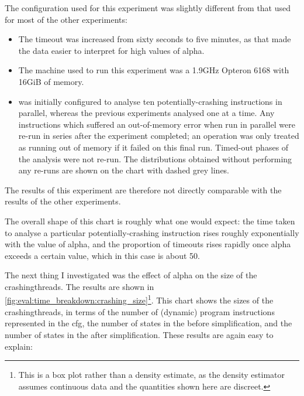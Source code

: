 The configuration used for this experiment was slightly different from
that used for most of the other experiments:
\begin{itemize}
\item The timeout was increased from sixty seconds to five minutes, as
  that made the data easier to interpret for high values of
  \gls{alpha}.
\item The machine used to run this experiment was a 1.9GHz Opteron
  6168 with 16GiB of memory.
\item {\Implementation} was initially configured to analyse ten
  potentially-crashing instructions in parallel, whereas the previous
  experiments analysed one at a time.  Any instructions which suffered
  an out-of-memory error when run in parallel were re-run in series
  after the experiment completed; an operation was only treated as
  running out of memory if it failed on this final run.  Timed-out
  phases of the analysis were not re-run.  The distributions obtained
  without performing any re-runs are shown on the chart with dashed
  grey lines.
\end{itemize}
The results of this experiment are therefore not directly comparable
with the results of the other experiments.

The overall shape of this chart is roughly what one would expect: the
time taken to analyse a particular potentially-crashing instruction
rises roughly exponentially with the value of \gls{alpha}, and the
proportion of timeouts rises rapidly once \gls{alpha} exceeds a
certain value, which in this case is about 50.

The next thing I investigated was the effect of \gls{alpha} on the
size of the \glspl{crashingthread}.  The results are shown in
\autoref{fig:eval:time_breakdown:crashing_size}\footnote{This is a box
  plot rather than a density estimate, as the density estimator
  assumes continuous data and the quantities shown here are
  discreet.}.  This chart shows the sizes of the
\glspl{crashingthread}, in terms of the number of (dynamic) program
instructions represented in the \gls{cfg}, the number of states in the
{\StateMachine} before simplification, and the number of states in the
{\StateMachine} after simplification.  These results are again easy to
explain:

